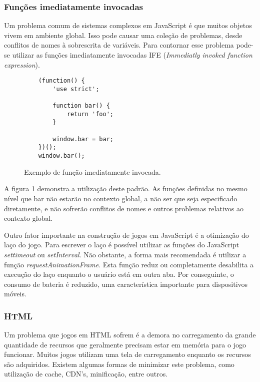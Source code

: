 \subsubsection{Funções imediatamente invocadas}

Um problema comum de sistemas complexos em JavaScript é que muitos
objetos vivem em ambiente global. Isso pode causar uma coleção de
problemas, desde conflitos de nomes à sobrescrita de variáveis. Para
contornar esse problema pode-se utilizar as funções imediatamente
invocadas IFE (\textit{Immediatly invoked function expression}).

\begin{figure}[H]
\centering
\begin{verbatim}
    (function() {
        'use strict';

        function bar() {
            return 'foo';
        }

        window.bar = bar;
    })();
    window.bar();
\end{verbatim}
\caption{Exemplo de função imediatamente invocada.}
\label{fig:iife}
\end{figure}

A figura \ref{fig:iife} demonstra a utilização deste padrão. As
funções definidas no mesmo nível que bar não estarão no contexto
global, a não ser que seja especificado diretamente, e não sofrerão
conflitos de nomes e outros problemas relativos ao contexto global.

Outro fator importante na construção de jogos em JavaScript é a
otimização do laço do jogo. Para escrever o laço é possível
utilizar as funções do JavaScript \textit{settimeout} ou
\textit{setInterval}. Não obstante, a forma mais recomendada é
utilizar a função \textit{requestAnimationFrame}. Esta função reduz
ou completamente desabilita a execução do laço enquanto o usuário está
em outra aba. Por conseguinte, o consumo de bateria é reduzido, uma
característica importante para dispositivos móveis.

\subsubsection{HTML}

Um problema que jogos em HTML sofrem é a demora no carregamento
da grande quantidade de recursos que geralmente precisam estar em
memória para o jogo funcionar. Muitos jogos utilizam uma tela de
carregamento enquanto os recursos são adquiridos. Existem algumas
formas de minimizar este problema, como utilização de cache, CDN's,
minificação, entre outros.

